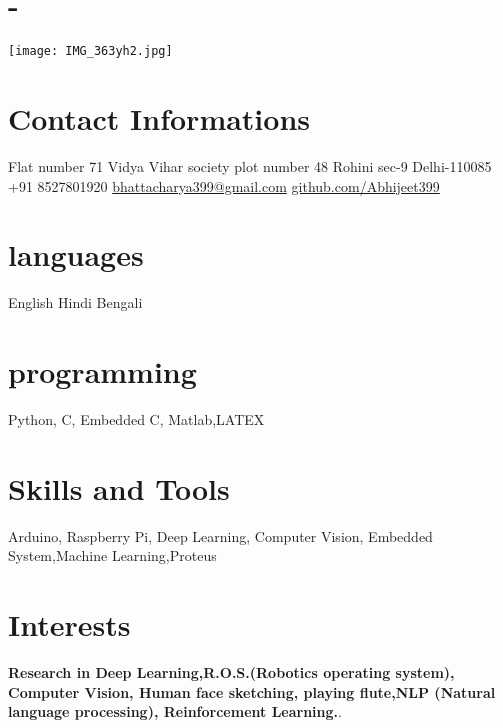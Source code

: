 \documentclass[espanol]{cv-style}     %
\begin{document}

\begin{aside}
\section{-}
\texttt{[image: IMG\_363yh2.jpg]}
%
\section{Contact Informations}
    Flat number 71
    Vidya Vihar society
    plot number 48
    Rohini sec-9
    Delhi-110085
    ~
    +91 8527801920
    \href{mailto:bhattacharya399@gmail.com}{bhattacharya399@gmail.com}
    \href{https://github.com/Abhijeet399}{github.com/Abhijeet399}
%
\section{languages}
    English
    Hindi
    Bengali
  \section{programming}
    Python, C,
    Embedded C,
    Matlab,LATEX
  \section{Skills and Tools}
    Arduino, Raspberry Pi, Deep Learning, Computer Vision,
    Embedded System,Machine Learning,Proteus
%
\end{aside}
\vspace{0.2cm}
\section{Interests}
  \vspace{-0.2cm}
 \textbf{Research in Deep Learning,R.O.S.(Robotics operating system), Computer Vision, Human face sketching, playing flute,NLP (Natural language processing), Reinforcement Learning.}.
\end{document}
